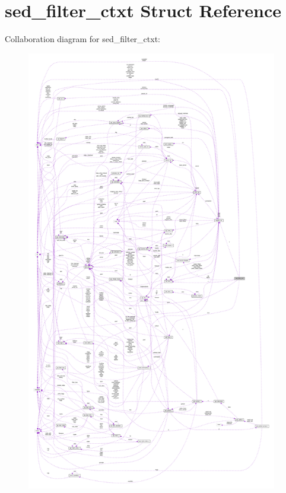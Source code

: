 \hypertarget{structsed__filter__ctxt}{}\section{sed\+\_\+filter\+\_\+ctxt Struct Reference}
\label{structsed__filter__ctxt}


Collaboration diagram for sed\+\_\+filter\+\_\+ctxt\+:
\nopagebreak
\begin{figure}[H]
\begin{center}
\leavevmode
\includegraphics[height=550pt]{structsed__filter__ctxt__coll__graph}
\end{center}
\end{figure}
